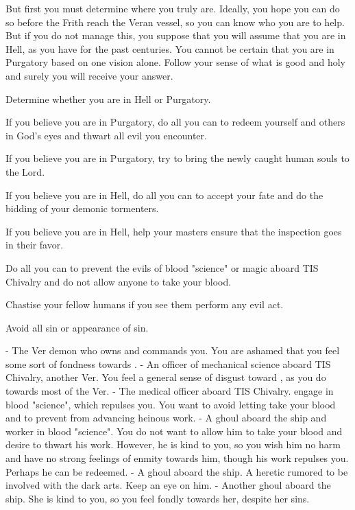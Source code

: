 \documentclass[char]{guildcamp4}
\begin{document}
But first you must determine where you truly are. Ideally, you hope you can do so before the Frith reach the Veran vessel, so you can know who you are to help. But if you do not manage this, you suppose that you will assume that you are in Hell, as you have for the past centuries. You cannot be certain that you are in Purgatory based on one vision alone. Follow your sense of what is good and holy and surely you will receive your answer.

\begin{itemz}[Goals]
	\item Determine whether you are in Hell or Purgatory.
	\item If you believe you are in Purgatory, do all you can to redeem yourself and others in God's eyes and thwart all evil you encounter.
	\item If you believe you are in Purgatory, try to bring the newly caught human souls to the Lord.
	\item If you believe you are in Hell, do all you can to accept your fate and do the bidding of your demonic tormenters.
	\item If you believe you are in Hell, help your masters ensure that the inspection goes in their favor.
	\item Do all you can to prevent the evils of blood "science" or magic aboard TIS Chivalry and do not allow anyone to take your blood.
	\item Chastise your fellow humans if you see them perform any evil act.
	\item Avoid all sin or appearance of sin.
\end{itemz}

\begin{itemz}[Notes]
	\item 
\end{itemz}

\begin{contacts}
	\contact{\cVone{}} - The Ver demon who owns and commands you. You are ashamed that you feel some sort of fondness towards \cVone{\them}.
	\contact{\cVtwo{}} - An officer of mechanical science aboard TIS Chivalry, another Ver. You feel a general sense of disgust toward \cVtwo{\them}, as you do towards most of the Ver.
	\contact{\cVthree{}} - The medical officer aboard TIS Chivalry. \cVthree{\They} engage in blood "science", which repulses you. You want to avoid letting \cVthree{\them} take your blood and to prevent \cVthree{\them} from advancing \cVthree{\their} heinous work.
	\contact{\cJames{}} - A ghoul aboard the ship and worker in blood "science". You do not want to allow him to take your blood and desire to thwart his work. However, he is kind to you, so you wish him no harm and have no strong feelings of enmity towards him, though his work repulses you. Perhaps he can be redeemed.
	\contact{\cRasputin{}} - A ghoul aboard the ship. A heretic rumored to be involved with the dark arts. Keep an eye on him.  
	\contact{\cJulie{}} - Another ghoul aboard the ship. She is kind to you, so you feel fondly towards her, despite her sins. 
\end{contacts}

\end{document}
